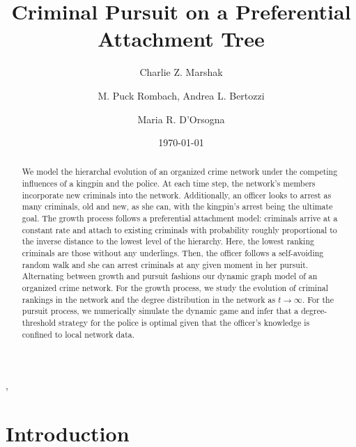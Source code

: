 \documentclass[%
 reprint,
 amsmath,amssymb,
 aps,
]{revtex4-1}
\theoremstyle{plain}
\theoremstyle{definition}
\begin{document}
\title{Criminal Pursuit on a Preferential Attachment Tree}
\author{Charlie Z. Marshak}
,

 \author{M. Puck Rombach, Andrea L. Bertozzi}
  \author{Maria R. D'Orsogna}
\date{\today}


\begin{abstract}
We model the hierarchal evolution of an organized crime network under the competing influences of a kingpin and the police.  At each time step, the network's members incorporate new criminals into the network.  Additionally, an officer looks to arrest as many criminals, old and new, as she can, with the kingpin's arrest being the ultimate goal.  The growth process follows a preferential attachment model: criminals arrive at a constant rate and attach to existing criminals with probability roughly proportional to the inverse distance to the lowest level of the hierarchy.  Here, the lowest ranking criminals are those without any underlings.  Then, the officer follows a self-avoiding random walk and she can arrest criminals at any given moment in her pursuit.  Alternating between growth and pursuit fashions our dynamic graph model of an organized crime network.  For the growth process, we study the evolution of criminal rankings in the network and the degree distribution in the network as $t \to \infty$.  For the pursuit process, we numerically simulate the dynamic game and infer that a degree-threshold strategy for the police is optimal given that the officer's knowledge is confined to local network data.
\end{abstract}


\maketitle

\section*{Introduction}
\end{document}
